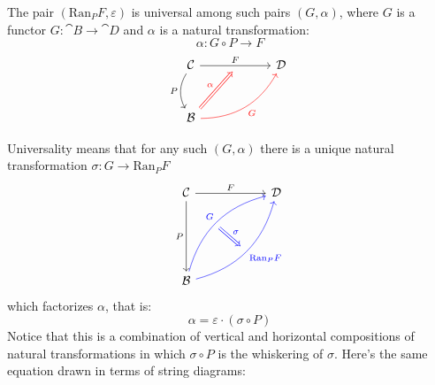 \documentclass[DaoFP]{subfiles}
\begin{document}
The pair $(\text{Ran}_P F, \varepsilon)$ is universal among such pairs $(G, \alpha)$, where $G$ is a functor $G \colon \cat B \to \cat D$ and $\alpha$ is a natural transformation:
\[ \alpha \colon G \circ P \to F \]
\[
 \begin{tikzcd} [row sep=1cm, column sep=1cm]
 \cat C
 \arrow[rr, "F", "" {name=ID, below} ]
 \arrow[d, bend right, "P"']
 && \cat D
 \\
 \cat B
  \arrow[urr, red, bend right, "G"']
 \arrow[Rightarrow, red, "\alpha",  to=ID]
 \end{tikzcd}
\]

Universality means that for any such $(G, \alpha)$ there is a unique natural transformation $\sigma \colon G \to \text{Ran}_P F$
\[
\begin{tikzcd}[row sep=2cm, column sep=2cm]
\cat C  \ar[d, "P"', "" {name=P}]
            \ar[r, "F", ""  {name=F, below, near start, bend right}]
&
\cat D
\\
\cat B
    \ar[ur, blue, bend left, "G", "" {name=G, below}]
    \ar[ur, blue, bend right, "\text{Ran}_P F"', "" {name=Ran}]
\arrow[Rightarrow, blue, "\sigma", from=G, to=Ran]
\end{tikzcd}
\]
 which factorizes $\alpha$, that is:
\[ \alpha = \varepsilon \cdot (\sigma \circ P) \]
Notice that this is a combination of vertical and horizontal compositions of natural transformations in which $\sigma \circ P$ is the whiskering of $\sigma$. Here's the same equation drawn in terms of string diagrams:
\end{document}
